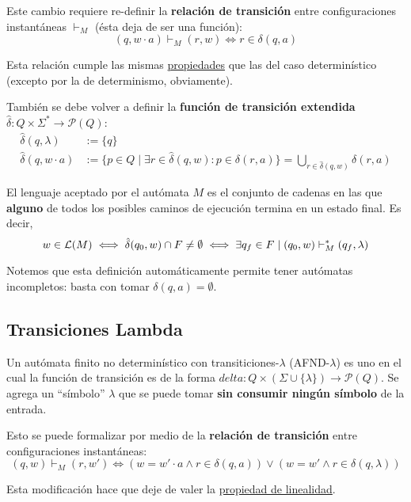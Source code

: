 
Este cambio requiere re-definir la \textbf{relación de transición} entre configuraciones instantáneas $\vdash_M$ (ésta deja de ser una función):
$$
(q, w \cdot a) \vdash_M (r, w) \iff r \in \delta(q, a)
$$

Esta relación cumple las mismas \hyperref[subsubsec-propiedades-rel-transicion]{propiedades} que las del caso determinístico (excepto por la de determinismo, obviamente).

También se debe volver a definir la \textbf{función de transición extendida} $\hat \delta : Q \times \Sigma^* \to \mathcal P (Q)$:
$$
\begin{aligned}
    \hat \delta(q, \lambda) & := \{q\} \\
    \hat \delta(q, w \cdot a) & := \{p \in Q \mid \exists r \in \hat \delta (q, w) : p \in \delta (r, a)\} = \bigcup_{r \in \hat \delta(q, w)} \delta(r, a)
\end{aligned}
$$

El lenguaje aceptado por el autómata $M$ es el conjunto de cadenas en las que \textbf{alguno} de todos los posibles caminos de ejecución termina en un estado final. Es decir,
$$
w \in \mathcal{L}(M) \iff \hat \delta(q_0, w) \cap F \neq \emptyset \iff \exists q_f \in F \mid (q_0, w) \vdash_M^* (q_f, \lambda)
$$

Notemos que esta definición automáticamente permite tener autómatas incompletos: basta con tomar $\delta(q, a) = \emptyset$.

\subsection{Transiciones Lambda}

Un autómata finito no determinístico con transiticiones-$\lambda$ (AFND-$\lambda$) es uno en el cual la función de transición es de la forma $delta : Q \times (\Sigma \cup \{\lambda\}) \to \mathcal P (Q)$. Se agrega un ``símbolo'' $\lambda$ que se puede tomar \textbf{sin consumir ningún símbolo} de la entrada.


Esto se puede formalizar por medio de la \textbf{relación de transición} entre configuraciones instantáneas:
$$
(q, w) \vdash_M (r, w') \iff (w = w' \cdot a \land r \in \delta(q, a)) \lor (w = w' \land r \in \delta(q, \lambda))
$$

Esta modificación hace que deje de valer la \hyperref[subsubsec-propiedades-rel-transicion]{propiedad de linealidad}.

